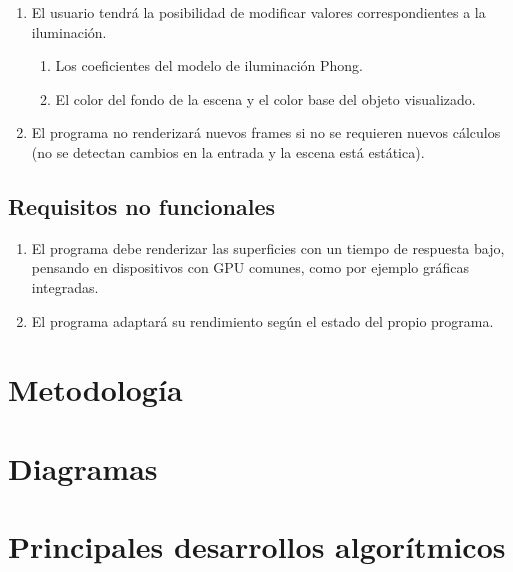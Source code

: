 \begin{enumerate}
		\item El usuario tendrá la posibilidad de modificar valores correspondientes a la iluminación.
		\begin{enumerate}
			\item Los coeficientes del modelo de iluminación Phong.
			\item El color del fondo de la escena y el color base del objeto visualizado.
		\end{enumerate}
			
		\item El programa no renderizará nuevos frames si no se requieren nuevos cálculos (no se detectan cambios en la entrada y la escena está estática).
	\end{enumerate}

	\subsection{Requisitos no funcionales}
	\begin{enumerate}
		\item El programa debe renderizar las superficies con un tiempo de respuesta bajo, pensando en dispositivos con GPU comunes, como por ejemplo gráficas integradas.
		\item El programa adaptará su rendimiento según el estado del propio programa.
	\end{enumerate}

\section{Metodología}

\section{Diagramas}

\section{Principales desarrollos algorítmicos}

\endinput
